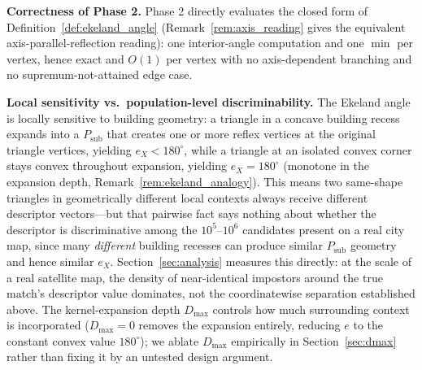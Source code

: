 \documentclass[10pt]{article}
\theoremstyle{plain}
\theoremstyle{definition}
\begin{document}
\noindent\textbf{Correctness of Phase 2.}
Phase 2 directly evaluates the closed form of
Definition~\ref{def:ekeland_angle} (Remark~\ref{rem:axis_reading} gives the
equivalent axis-parallel-reflection reading): one interior-angle computation
and one $\min$ per vertex, hence exact and $O(1)$ per vertex with no
axis-dependent branching and no supremum-not-attained edge case.

\noindent\textbf{Local sensitivity vs.\ population-level discriminability.}
The Ekeland angle is locally sensitive to building geometry: a triangle in a
concave building recess expands into a $P_{\mathrm{sub}}$ that creates one or
more reflex vertices at the original triangle vertices, yielding
$e_X < 180^\circ$, while a triangle at an isolated convex corner stays
convex throughout expansion, yielding $e_X = 180^\circ$ (monotone in the
expansion depth, Remark~\ref{rem:ekeland_analogy}). This means two
same-shape triangles in geometrically different local contexts always
receive different descriptor vectors---but that pairwise fact says nothing
about whether the descriptor is discriminative among the $10^5$--$10^6$
candidates present on a real city map, since many \emph{different} building
recesses can produce similar $P_{\mathrm{sub}}$ geometry and hence similar
$e_X$. Section~\ref{sec:analysis} measures this directly: at the scale of a
real satellite map, the density of near-identical impostors around the
true match's descriptor value dominates, not the coordinatewise separation
established above. The kernel-expansion depth $D_{\max}$ controls how much
surrounding context is incorporated ($D_{\max}=0$ removes the expansion
entirely, reducing $e$ to the constant convex value $180^\circ$); we
ablate $D_{\max}$ empirically in Section~\ref{sec:dmax} rather than
fixing it by an untested design argument.
\end{document}
